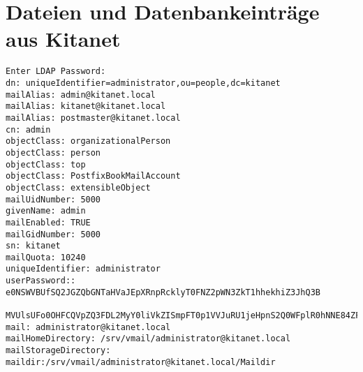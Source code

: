 \chapter{Dateien und Datenbankeinträge aus Kitanet}
\begin{lstlisting}[caption={Ergebnis der LDAP-Abfrage für den Nutzer 'administrator'}, label={ldapabfrage}]
Enter LDAP Password:
dn: uniqueIdentifier=administrator,ou=people,dc=kitanet
mailAlias: admin@kitanet.local
mailAlias: kitanet@kitanet.local
mailAlias: postmaster@kitanet.local
cn: admin
objectClass: organizationalPerson
objectClass: person
objectClass: top
objectClass: PostfixBookMailAccount
objectClass: extensibleObject
mailUidNumber: 5000
givenName: admin
mailEnabled: TRUE
mailGidNumber: 5000
sn: kitanet
mailQuota: 10240
uniqueIdentifier: administrator
userPassword:: e0NSWVBUfSQ2JGZQbGNTaHVaJEpXRnpRcklyT0FNZ2pWN3ZkT1hhekhiZ3JhQ3B
 MVUlsUFo0OHFCQVpZQ3FDL2MyY0liVkZISmpFT0p1VVJuRU1jeHpnS2Q0WFplR0hNNE84ZFdwREIv
mail: administrator@kitanet.local
mailHomeDirectory: /srv/vmail/administrator@kitanet.local
mailStorageDirectory: maildir:/srv/vmail/administrator@kitanet.local/Maildir
\end{lstlisting}
\newpage
